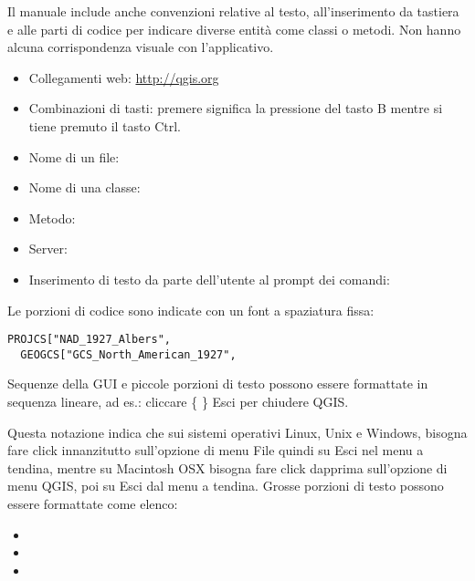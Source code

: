 
Il manuale include anche convenzioni relative al testo, all'inserimento da tastiera e alle parti di codice per indicare diverse entità come classi o metodi. Non hanno alcuna corrispondenza visuale con l'applicativo.

\begin{itemize}[label=--]
\item Collegamenti web: \url{http://qgis.org}
\item Combinazioni di tasti: premere  significa la pressione del tasto B mentre si tiene premuto il tasto Ctrl.
\item Nome di un file: 
\item Nome di una classe: 
\item Metodo: 
\item Server: 
\item Inserimento di testo da parte dell'utente al prompt dei comandi: 
\end{itemize}

Le porzioni di codice sono indicate con un font a spaziatura fissa:
\begin{verbatim}
PROJCS["NAD_1927_Albers",
  GEOGCS["GCS_North_American_1927",
\end{verbatim}


Sequenze della GUI e piccole porzioni di testo possono essere formattate in sequenza lineare, ad es.: cliccare \{\nix{} \} \arrow Esci per chiudere QGIS.

Questa notazione indica che sui sistemi operativi Linux, Unix e Windows, bisogna fare click innanzitutto sull'opzione di menu File quindi su Esci nel menu a tendina, mentre su 
Macintosh OSX bisogna fare click dapprima sull'opzione di menu QGIS, poi su Esci dal menu a tendina. Grosse porzioni di testo possono essere formattate come elenco:

\begin{itemize}
\item {}
\item {}
\item {}
\end{itemize}

